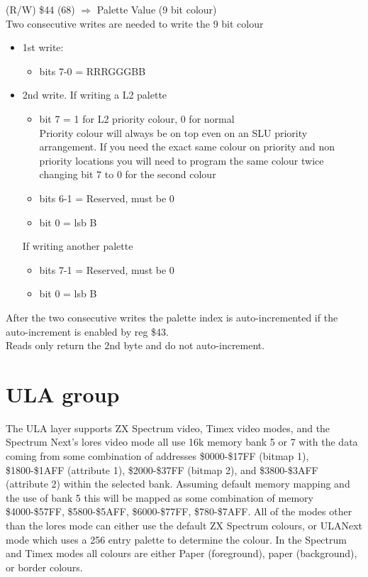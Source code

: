 (R/W) \$44 (68) $\Rightarrow$ Palette Value (9 bit colour)\\
Two consecutive writes are needed to write the 9 bit colour
\begin{itemize}
\item[] 1st write:
  \begin{itemize}
  \item[] bits 7-0 = RRRGGGBB
  \end{itemize}
\item[] 2nd write.
  If writing a L2 palette\\
  \begin{itemize}
  \item[] bit 7 = 1 for L2 priority colour, 0 for normal\\
    Priority colour will always be on top even on an SLU priority
    arrangement. If you need the exact same colour on priority and non
    priority locations you will need to program the same colour twice
    changing bit 7 to 0 for the second colour
  \item[] bits 6-1 = Reserved, must be 0
  \item[] bit 0 = lsb B
  \end{itemize}
  If writing another palette
  \begin{itemize}
  \item[] bits 7-1 = Reserved, must be 0
  \item[] bit 0 = lsb B
  \end{itemize}
\end{itemize}
After the two consecutive writes the palette index is
auto-incremented if the auto-increment is enabled by reg \$43.\\
Reads only return the 2nd byte and do not auto-increment.

\section{ULA group}
The ULA layer supports ZX Spectrum video, Timex video modes, and the
Spectrum Next’s lores video mode all use 16k memory bank 5 or 7 with
the data coming from some combination of addresses \$0000-\$17FF
(bitmap 1), \$1800-\$1AFF (attribute 1), \$2000-\$37FF (bitmap 2), and
\$3800-\$3AFF (attribute 2) within the selected bank.  Assuming
default memory mapping and the use of bank 5 this will be mapped as
some combination of memory \$4000-\$57FF, \$5800-\$5AFF,
\$6000-\$77FF, \$780-\$7AFF. All of the modes other than the lores
mode can either use the default ZX Spectrum colours, or ULANext mode
which uses a 256 entry palette to determine the colour. In the
Spectrum and Timex modes all colours are either Paper (foreground),
paper (background), or border colours.

